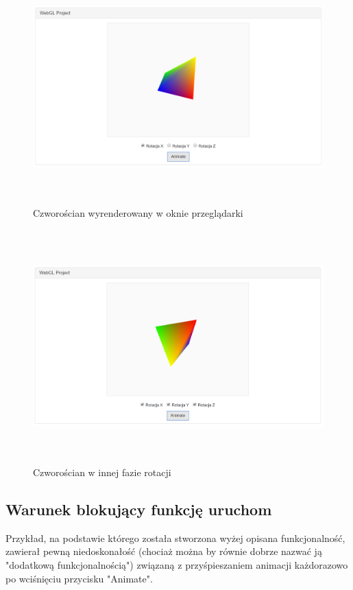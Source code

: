 \documentclass[a4paper,11pt]{article}
\begin{document}
\begin{figure}[H]
\centering
 \includegraphics[height=9cm]{czworoscian.PNG}
\caption{Czworościan wyrenderowany w oknie przeglądarki}
\end{figure}


\begin{figure}[H]
\centering
 \includegraphics[height=9cm]{czworoscian2.PNG}
\caption{Czworościan w innej fazie rotacji}
\end{figure}

\subsection{Warunek blokujący funkcję uruchom}

Przykład, na podstawie którego została stworzona wyżej opisana funkcjonalność, zawierał pewną niedoskonałość (chociaż można by równie dobrze nazwać ją "dodatkową funkcjonalnością") związaną z przyśpieszaniem animacji każdorazowo po wciśnięciu przycisku "Animate".
\end{document}
